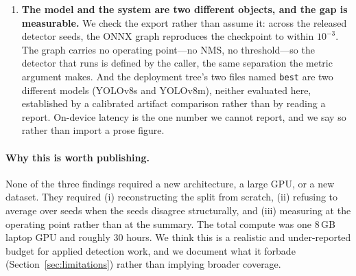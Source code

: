 \begin{enumerate}[leftmargin=1.2em,itemsep=2pt]
\item \textbf{The model and the system are two different objects, and the gap is
measurable.} We check the export rather than assume it: across the released
detector seeds, the ONNX graph reproduces the checkpoint to within
$10^{-3}$. The graph carries no operating point---no NMS, no threshold---so the
detector that runs is defined by the caller, the same separation the metric
argument makes. And the deployment tree's two files named \texttt{best} are two
different models (YOLOv8s and YOLOv8m), neither evaluated here, established by a
calibrated artifact comparison rather than by reading a report. On-device latency
is the one number we cannot report, and we say so rather than import a prose
figure.
\end{enumerate}

\paragraph{Why this is worth publishing.} None of the three findings required a
new architecture, a large GPU, or a new dataset. They required (i) reconstructing
the split from scratch, (ii) refusing to average over seeds when the seeds
disagree structurally, and (iii) measuring at the operating point rather than at
the summary. The total compute was one 8\,GB laptop GPU and roughly $30$ hours.
We think this is a realistic and under-reported budget for applied detection
work, and we document what it forbade (Section~\ref{sec:limitations}) rather than
implying broader coverage.

